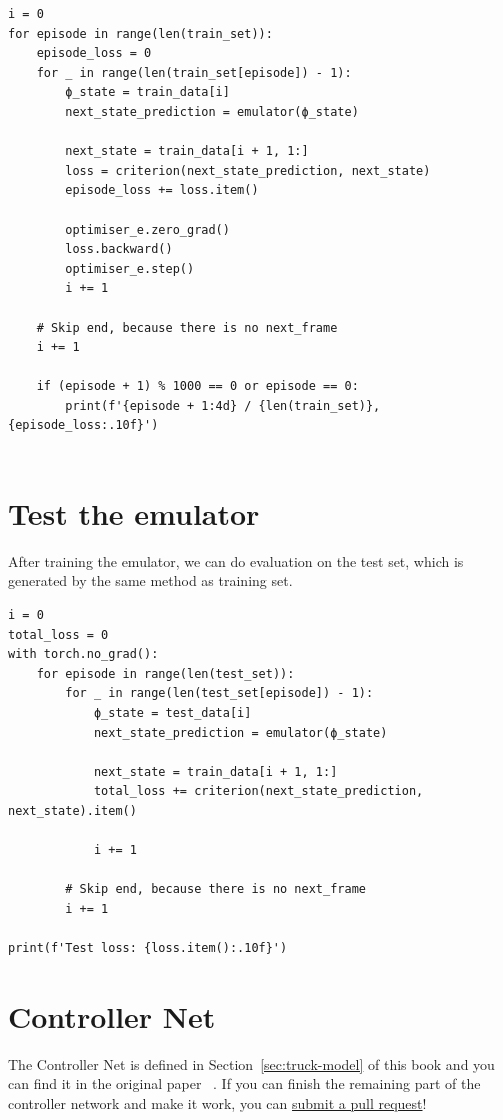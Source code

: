 \begin{verbatim}
i = 0
for episode in range(len(train_set)):
    episode_loss = 0
    for _ in range(len(train_set[episode]) - 1):
        ϕ_state = train_data[i]
        next_state_prediction = emulator(ϕ_state)
        
        next_state = train_data[i + 1, 1:]
        loss = criterion(next_state_prediction, next_state)
        episode_loss += loss.item()
        
        optimiser_e.zero_grad()
        loss.backward()
        optimiser_e.step()
        i += 1
    
    # Skip end, because there is no next_frame
    i += 1
    
    if (episode + 1) % 1000 == 0 or episode == 0:
        print(f'{episode + 1:4d} / {len(train_set)}, {episode_loss:.10f}')


\end{verbatim}

\section{Test the emulator}
After training the emulator, we can do evaluation on the test set, which is generated by the same method as training set.

\begin{verbatim}
i = 0
total_loss = 0
with torch.no_grad():
    for episode in range(len(test_set)):
        for _ in range(len(test_set[episode]) - 1):
            ϕ_state = test_data[i]
            next_state_prediction = emulator(ϕ_state)

            next_state = train_data[i + 1, 1:]
            total_loss += criterion(next_state_prediction, next_state).item()

            i += 1

        # Skip end, because there is no next_frame
        i += 1
    
print(f'Test loss: {loss.item():.10f}')
\end{verbatim}

\section{Controller Net}
The Controller Net is defined in Section~\ref{sec:truck-model} of this book and you can find it in the original paper ~\cite{nguyen1990truck}. If you can finish the remaining part of the controller network and make it work, you can \href{https://github.com/Atcold/pytorch-Deep-Learning-Minicourse/blob/master/14-truck_backer-upper.ipynb}{submit a pull request}! 